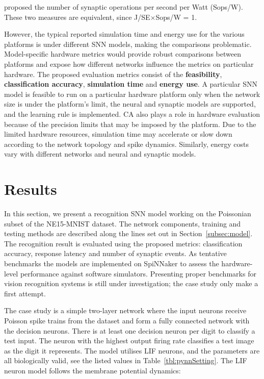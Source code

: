 \citet{merolla2014million} proposed the number of synaptic operations per second per Watt (Sops/W).
These two measures are equivalent, since J/SE$\times$Sops/W = 1.

However, the typical reported simulation time and energy use for the various platforms is under different SNN models, making the comparisons problematic.
Model-specific hardware metrics would provide robust comparisons between platforms and expose how different networks influence the metrics on particular hardware.
The proposed evaluation metrics consist of the \textbf{feasibility}, \textbf{classification accuracy}, \textbf{simulation time} and \textbf{energy use}.
A particular SNN model is feasible to run on a particular hardware platform only when the network size is under the platform's limit, the neural and synaptic models are supported, and the learning rule is implemented.
CA also plays a role in hardware evaluation because of the precision limits that may be imposed by the platform.
Due to the limited hardware resources, simulation time may accelerate or slow down according to the network topology and spike dynamics.
Similarly, energy costs vary with different networks and neural and synaptic models.

\section{Results}
\label{sec:test}
In this section, we present a recognition SNN model working on the Poissonian subset of the NE15-MNIST dataset.
The network components, training and testing methods are described along the lines set out in Section~\ref{subsec:model}.
The recognition result is evaluated using the proposed metrics: classification accuracy, response latency and number of synaptic events.
As tentative benchmarks the models are implemented on SpiNNaker to assess the hardware-level performance against software simulators.
Presenting proper benchmarks for vision recognition systems is still under investigation; the case study only make a first attempt.

The case study is a simple two-layer network where the input neurons receive Poisson spike trains from the dataset and form a fully connected network with the decision neurons.
There is at least one decision neuron per digit to classify a test input.
The neuron with the highest output firing rate classifies a test image as the digit it represents.
The model utilises LIF neurons, and the parameters are all biologically valid, see the listed values in Table~\ref{tbl:pynnSetting}.
The LIF neuron model follows the membrane potential dynamics:

